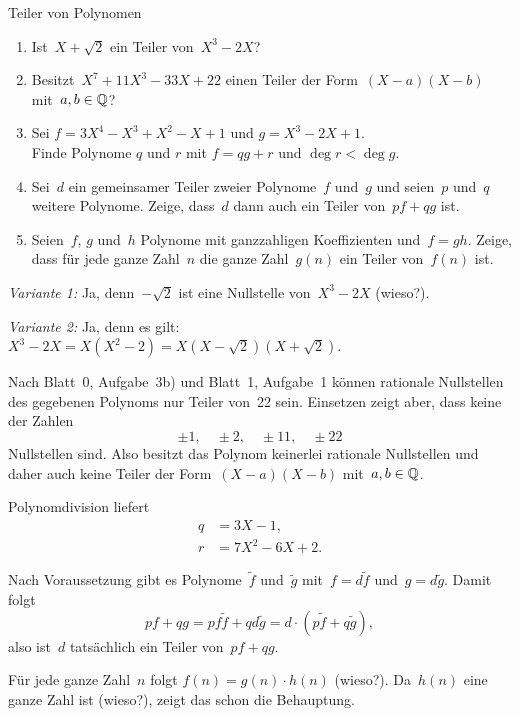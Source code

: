 \documentclass{algblatt}
\begin{document}
\begin{aufgabe}{Teiler von Polynomen}
\begin{enumerate}
\item Ist~$X+\sqrt{2}$ ein Teiler von~$X^3-2X$?
\item Besitzt~$X^7 + 11 X^3 - 33 X + 22$ einen Teiler der
Form~$(X-a)(X-b)$ mit~$a,b \in \mathbb{Q}$?
\item Sei $f = 3 X^4 - X^3 + X^2 - X + 1$ und $g = X^3 - 2 X + 1$. \\
Finde Polynome $q$ und $r$ mit $f = q g + r$ und
$\deg r < \deg g$.
\item Sei~$d$ ein gemeinsamer Teiler zweier Polynome~$f$ und~$g$ und seien~$p$
und~$q$ weitere Polynome.
Zeige, dass~$d$ dann auch ein Teiler von~$pf + qg$ ist.
\item Seien~$f$, $g$ und~$h$ Polynome mit ganzzahligen Koeffizienten und~$f =
gh$. Zeige, dass für jede ganze Zahl~$n$ die ganze Zahl~$g(n)$ ein Teiler
von~$f(n)$ ist.
\end{enumerate}
\begin{loesungE}
\item \emph{Variante 1:} Ja, denn~$-\sqrt{2}$ ist eine Nullstelle von~$X^3 -
2X$ (wieso?).

\emph{Variante 2:} Ja, denn es gilt:
$X^3 - 2X = X (X^2 - 2) = X (X - \sqrt{2}) (X + \sqrt{2})$.

\item Nach Blatt~0, Aufgabe~3b) und Blatt~1, Aufgabe~1 können
rationale Nullstellen des gegebenen Polynoms nur Teiler von~22 sein. Einsetzen
zeigt aber, dass keine der Zahlen
\[ \pm 1, \quad \pm 2, \quad \pm 11, \quad \pm 22 \]
Nullstellen sind. Also besitzt das Polynom keinerlei rationale Nullstellen und
daher auch keine Teiler der Form~$(X-a)(X-b)$ mit~$a,b \in \mathbb{Q}$.

\item Polynomdivision liefert
\begin{align*}
  q &= 3X - 1, \\
  r &= 7X^2 - 6X + 2.
\end{align*}

\item Nach Voraussetzung gibt es Polynome~$\tilde f$ und~$\tilde g$ mit~$f = d
\tilde f$ und~$g = d \tilde g$. Damit folgt
\[ pf + qg = pf\tilde f + qd\tilde g = d \cdot (p\tilde f + q\tilde g), \]
also ist~$d$ tatsächlich ein Teiler von~$pf+qg$.

\item Für jede ganze Zahl~$n$ folgt $f(n) = g(n) \cdot h(n)$ (wieso?). Da~$h(n)$ eine
ganze Zahl ist (wieso?), zeigt das schon die Behauptung.
\end{loesungE}
\end{aufgabe}
\end{document}
